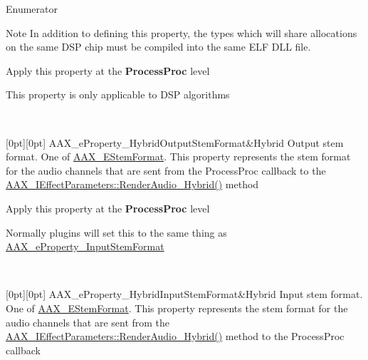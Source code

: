\begin{DoxyEnumFields}{Enumerator}
\begin{DoxyNote}{Note}
In addition to defining this property, the types which will share allocations on the same D\+SP chip must be compiled into the same E\+LF D\+LL file.
\end{DoxyNote}
\begin{DoxyItemize}
\item Apply this property at the {\bfseries{Process\+Proc}} level \item This property is only applicable to D\+SP algorithms \end{DoxyItemize}
\\
\hline

[0pt][0pt]{}\mbox{\label{a00662_ga13e384f22825afd3db6d68395b79ce0dac30a4e73772e37267dfef39ae3122705}} 
A\+A\+X\+\_\+e\+Property\+\_\+\+Hybrid\+Output\+Stem\+Format&Hybrid Output stem format. One of \mbox{\hyperlink{a00491_ad8af5ef008b2bd478add9a0acb0a1d85}{A\+A\+X\+\_\+\+E\+Stem\+Format}}. This property represents the stem format for the audio channels that are sent from the Process\+Proc callback to the \mbox{\hyperlink{a00805_gae6139041de22f51f3146d26a01c54c1b}{A\+A\+X\+\_\+\+I\+Effect\+Parameters\+::\+Render\+Audio\+\_\+\+Hybrid()}} method

\begin{DoxyItemize}
\item Apply this property at the {\bfseries{Process\+Proc}} level \item Normally plugins will set this to the same thing as \mbox{\hyperlink{a00662_a13e384f22825afd3db6d68395b79ce0dadebf03028b758123965a8b988fa2df99}{A\+A\+X\+\_\+e\+Property\+\_\+\+Input\+Stem\+Format}} \end{DoxyItemize}
\\
\hline

[0pt][0pt]{}\mbox{\label{a00662_ga13e384f22825afd3db6d68395b79ce0da33a950bc2e02d38fc3be0a0ad8cc89b1}} 
A\+A\+X\+\_\+e\+Property\+\_\+\+Hybrid\+Input\+Stem\+Format&Hybrid Input stem format. One of \mbox{\hyperlink{a00491_ad8af5ef008b2bd478add9a0acb0a1d85}{A\+A\+X\+\_\+\+E\+Stem\+Format}}. This property represents the stem format for the audio channels that are sent from the \mbox{\hyperlink{a00805_gae6139041de22f51f3146d26a01c54c1b}{A\+A\+X\+\_\+\+I\+Effect\+Parameters\+::\+Render\+Audio\+\_\+\+Hybrid()}} method to the Process\+Proc callback


\end{DoxyEnumFields}

